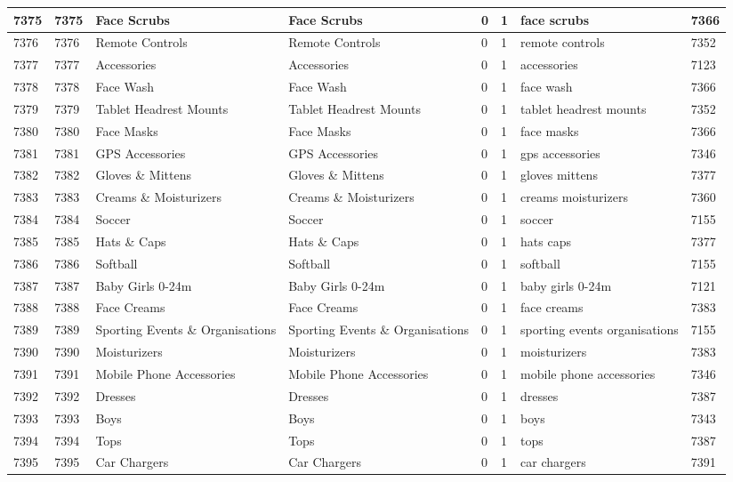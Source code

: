 \begin{longtable}{|l|l|l|l|l|l|l|l|}
7375 & 7375 & Face Scrubs & Face Scrubs & 0 & 1 & face scrubs & 7366 \\ \hline 
7376 & 7376 & Remote Controls & Remote Controls & 0 & 1 & remote controls & 7352 \\ \hline 
7377 & 7377 & Accessories & Accessories & 0 & 1 & accessories & 7123 \\ \hline 
7378 & 7378 & Face Wash & Face Wash & 0 & 1 & face wash & 7366 \\ \hline 
7379 & 7379 & Tablet Headrest Mounts & Tablet Headrest Mounts & 0 & 1 & tablet headrest mounts & 7352 \\ \hline 
7380 & 7380 & Face Masks & Face Masks & 0 & 1 & face masks & 7366 \\ \hline 
7381 & 7381 & GPS Accessories & GPS Accessories & 0 & 1 & gps accessories & 7346 \\ \hline 
7382 & 7382 & Gloves \& Mittens & Gloves \& Mittens & 0 & 1 & gloves mittens & 7377 \\ \hline 
7383 & 7383 & Creams \& Moisturizers & Creams \& Moisturizers & 0 & 1 & creams moisturizers & 7360 \\ \hline 
7384 & 7384 & Soccer & Soccer & 0 & 1 & soccer & 7155 \\ \hline 
7385 & 7385 & Hats \& Caps & Hats \& Caps & 0 & 1 & hats caps & 7377 \\ \hline 
7386 & 7386 & Softball & Softball & 0 & 1 & softball & 7155 \\ \hline 
7387 & 7387 & Baby Girls 0-24m & Baby Girls 0-24m & 0 & 1 & baby girls 0-24m & 7121 \\ \hline 
7388 & 7388 & Face Creams & Face Creams & 0 & 1 & face creams & 7383 \\ \hline 
7389 & 7389 & Sporting Events \& Organisations & Sporting Events \& Organisations & 0 & 1 & sporting events organisations & 7155 \\ \hline 
7390 & 7390 & Moisturizers & Moisturizers & 0 & 1 & moisturizers & 7383 \\ \hline 
7391 & 7391 & Mobile Phone Accessories & Mobile Phone Accessories & 0 & 1 & mobile phone accessories & 7346 \\ \hline 
7392 & 7392 & Dresses & Dresses & 0 & 1 & dresses & 7387 \\ \hline 
7393 & 7393 & Boys & Boys & 0 & 1 & boys & 7343 \\ \hline 
7394 & 7394 & Tops & Tops & 0 & 1 & tops & 7387 \\ \hline 
7395 & 7395 & Car Chargers & Car Chargers & 0 & 1 & car chargers & 7391 \\ \hline 

\end{longtable}
